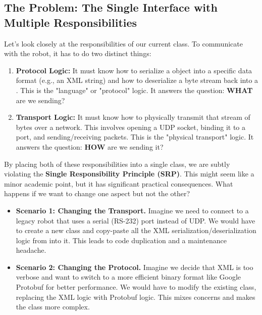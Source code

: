 \subsection{The Problem: The Single Interface with Multiple Responsibilities}
\label{subsec:hal_single_responsibility_problem}

Let's look closely at the responsibilities of our current  class. To communicate with the robot, it has to do two distinct things:
\begin{enumerate}
    \item \textbf{Protocol Logic:} It must know how to serialize a  object into a specific data format (e.g., an XML string) and how to deserialize a byte stream back into a . This is the "language" or "protocol" logic. It answers the question: \textbf{WHAT} are we sending?
    \item \textbf{Transport Logic:} It must know how to physically transmit that stream of bytes over a network. This involves opening a UDP socket, binding it to a port, and sending/receiving packets. This is the "physical transport" logic. It answers the question: \textbf{HOW} are we sending it?
\end{enumerate}

By placing both of these responsibilities into a single class, we are subtly violating the \textbf{Single Responsibility Principle (SRP)}. This might seem like a minor academic point, but it has significant practical consequences. What happens if we want to change one aspect but not the other?
\begin{itemize}
    \item \textbf{Scenario 1: Changing the Transport.} Imagine we need to connect to a legacy robot that uses a serial (RS-232) port instead of UDP. We would have to create a new  class and copy-paste all the XML serialization/deserialization logic from  into it. This leads to code duplication and a maintenance headache.
    \item \textbf{Scenario 2: Changing the Protocol.} Imagine we decide that XML is too verbose and want to switch to a more efficient binary format like Google Protobuf for better performance. We would have to modify the existing  class, replacing the XML logic with Protobuf logic. This mixes concerns and makes the class more complex.
\end{itemize}

